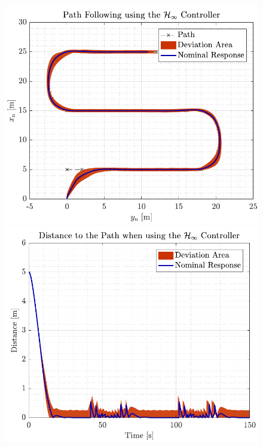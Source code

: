 \begin{figure}[H]
    \captionbox 
    {   
        \label{fig:path_rob_no_correc}
    }                                                                 
    {                                                                  
        \includegraphics[width=.45\textwidth]{figures/path_rob_no_correc}         
    }                                                                    
    \hspace{5pt}                                                          
    \captionbox  
    {      
        \label{fig:dist_rob_no_correc}
    }                                                                          
    {
        \includegraphics[width=.45\textwidth]{figures/dist_rob_no_correc}
    }
\end{figure}